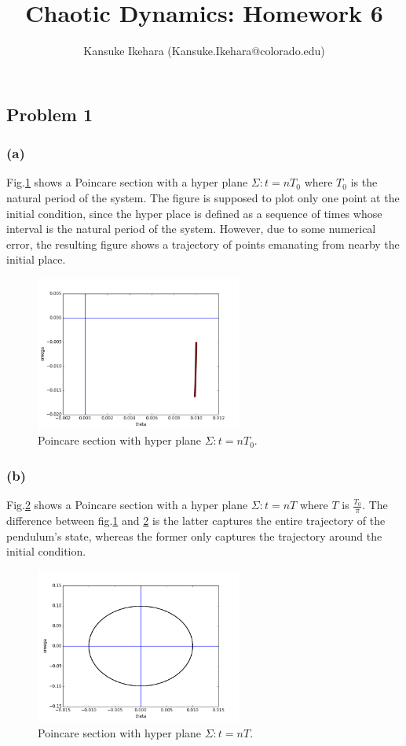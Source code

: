 \documentclass{article}
\title{Chaotic Dynamics: Homework 6}
\author{Kansuke Ikehara (Kansuke.Ikehara@colorado.edu)}
\begin{document}
\maketitle

\subsection*{Problem 1}
\subsubsection*{(a)}
Fig.\ref{q1a} shows a Poincare section with a hyper plane $\Sigma:t = nT_{0}$ where $T_{0}$ is the natural period of the system. The figure is supposed to plot only one point at the initial condition, since the hyper place is defined as a sequence of times whose interval is the natural period of the system. However, due to some numerical error, the resulting figure shows a trajectory of points emanating from nearby the initial place. 
\begin{figure}[h]
  \centering
  \includegraphics[height=2in]{figs/q1/q1a.png}
  \caption{Poincare section with hyper plane $\Sigma:t = nT_{0}$.}
  \label{q1a}
\end{figure}

\subsubsection*{(b)}
Fig.\ref{q1b} shows a Poincare section with a hyper plane $\Sigma:t = nT$ where $T$ is $\frac{T_{0}}{\pi}$. The difference between fig.\ref{q1a} and \ref{q1b} is the latter captures the entire trajectory of the pendulum's state, whereas the former only captures the trajectory around the initial condition. 

\begin{figure}[h]
  \centering
  \includegraphics[height=2in]{figs/q1/q1b.png}
  \caption{Poincare section with hyper plane $\Sigma:t = nT$.}
  \label{q1b}
\end{figure}
\end{document}
